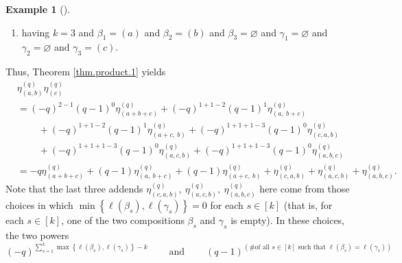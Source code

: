 \documentclass[numbers=enddot,12pt,final,onecolumn,notitlepage]{scrartcl}%
\theoremstyle{definition}
\newtheorem{exam}[theo]{Example}
\newenvironment{example}[1][]
{\begin{exam}[#1]\begin{leftbar}}
{\end{leftbar}\end{exam}}
\let\sumnonlimits\sum
\renewcommand{\sum}{\sumnonlimits\limits}
\begin{document}
\begin{example}
\begin{enumerate}
\item having $k=3$ and $\beta_{1}=\left(  a\right)  $ and $\beta_{2}=\left(
b\right)  $ and $\beta_{3}=\varnothing$ and $\gamma_{1}=\varnothing$ and
$\gamma_{2}=\varnothing$ and $\gamma_{3}=\left(  c\right)  $.
\end{enumerate}

Thus, Theorem \ref{thm.product.1} yields%
\begin{align*}
&  \eta_{\left(  a,b\right)  }^{\left(  q\right)  }\eta_{\left(  c\right)
}^{\left(  q\right)  }\\
&  =\left(  -q\right)  ^{2-1}\left(  q-1\right)  ^{0}\eta_{\left(
a+b+c\right)  }^{\left(  q\right)  }+\left(  -q\right)  ^{1+1-2}\left(
q-1\right)  ^{1}\eta_{\left(  a,\ b+c\right)  }^{\left(  q\right)  }\\
&  \ \ \ \ \ \ \ \ \ \ +\left(  -q\right)  ^{1+1-2}\left(  q-1\right)
^{1}\eta_{\left(  a+c,\ b\right)  }^{\left(  q\right)  }+\left(  -q\right)
^{1+1+1-3}\left(  q-1\right)  ^{0}\eta_{\left(  c,a,b\right)  }^{\left(
q\right)  }\\
&  \ \ \ \ \ \ \ \ \ \ +\left(  -q\right)  ^{1+1+1-3}\left(  q-1\right)
^{0}\eta_{\left(  a,c,b\right)  }^{\left(  q\right)  }+\left(  -q\right)
^{1+1+1-3}\left(  q-1\right)  ^{0}\eta_{\left(  a,b,c\right)  }^{\left(
q\right)  }\\
&  =-q\eta_{\left(  a+b+c\right)  }^{\left(  q\right)  }+\left(  q-1\right)
\eta_{\left(  a,\ b+c\right)  }^{\left(  q\right)  }+\left(  q-1\right)
\eta_{\left(  a+c,\ b\right)  }^{\left(  q\right)  }+\eta_{\left(
c,a,b\right)  }^{\left(  q\right)  }+\eta_{\left(  a,c,b\right)  }^{\left(
q\right)  }+\eta_{\left(  a,b,c\right)  }^{\left(  q\right)  }.
\end{align*}
Note that the last three addends $\eta_{\left(  c,a,b\right)  }^{\left(
q\right)  },\ \eta_{\left(  a,c,b\right)  }^{\left(  q\right)  }%
,\ \eta_{\left(  a,b,c\right)  }^{\left(  q\right)  }$ here come from those
choices in which $\min\left\{  \ell\left(  \beta_{s}\right)  ,\ell\left(
\gamma_{s}\right)  \right\}  =0$ for each $s\in\left[  k\right]  $ (that is,
for each $s\in\left[  k\right]  $, one of the two compositions $\beta_{s}$ and
$\gamma_{s}$ is empty). In these choices, the two powers%
\[
\left(  -q\right)  ^{\sum_{s=1}^{k}\max\left\{  \ell\left(  \beta_{s}\right)
,\ell\left(  \gamma_{s}\right)  \right\}  -k}\ \ \ \ \ \ \ \ \ \ \text{and}%
\ \ \ \ \ \ \ \ \ \ \left(  q-1\right)  ^{\left(  \text{\# of all }s\in\left[
k\right]  \text{ such that }\ell\left(  \beta_{s}\right)  =\ell\left(
\gamma_{s}\right)  \right)  }%
\]
\end{example}
\end{document}
